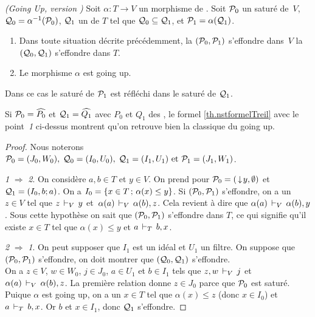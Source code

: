 \begin{proposition} 
\label{propGUclass} {\em (Going Up, version \procs)} 
Soit $\alpha:T\to V$ un morphisme de \trdis.  
Soit ${\cal P}_0$ un  \proi saturé de~$V$, ${\cal Q}_0=\alpha^{-1}({\cal P}_0)$, ${\cal Q}_1$ 
un \proi  de $T$ tel que ${\cal Q}_0\subseteq {\cal Q}_1$, et ${\cal P}_1=\alpha({\cal Q}_1)$.   \Propeq
\begin{enumerate}
\item  Dans toute situation décrite précédemment, la \proc 
$({\cal P}_0,{\cal P}_1)$ 
s'effondre dans~$V$ \ssi la \proc $({\cal Q}_0,{\cal Q}_1)$ s'effondre dans $T$.
\item  Le morphisme $\alpha$ est going up.
\end{enumerate}
Dans ce cas le saturé de ${\cal P}_1$ est réfléchi dans le saturé de ${\cal Q}_1$.
\end{proposition}
Si ${\cal P}_0=\widehat{P_0}$ et ${\cal Q}_1=\widehat{Q_1}$ avec $P_0$ et $Q_1$ des \ideps, le \nst formel \ref{th.nstformelTreil} avec le point~\emph{1} ci-dessus montrent qu'on retrouve bien la \dfn classique du going up.
\begin{proof}
Nous noterons
${\cal P}_0=(J_0,W_0),\; {\cal Q}_0= (I_0,U_0),\; {\cal Q}_1= (I_1,U_1) \hbox{ et }
{\cal P}_1= (J_{1},W_{1})$. 

\smallskip \noindent 
\emph{1} $\Rightarrow$ \emph{2}. On considère $a,b\in T$ et $y\in V$. On prend pour ${\cal P}_0=(\,\downarrow\! y,\emptyset)$ et ${\cal Q}_1=(I_0,b;a)$. On a $I_0=\{x\in T \,; \,\alpha(x)\leq y\}$.
Si $({\cal P}_0,{\cal P}_1)$ s'effondre, on a un $z\in V$ tel que $z\,\vdash_{V}\, y$ \hbox{et $\alpha(a)\,\vdash_{V}\, \alpha(b), z$}. Cela revient à dire que $\alpha(a)\,\vdash_{V}\, \alpha(b), y$. Sous cette hypothèse on sait que $({\cal P}_0,{\cal P}_1)$ s'effondre dans $T$, ce qui signifie qu'il existe $x\in T$ tel que $\alpha(x)\leq y$ et $a\,\vdash_{T}\, b, x$. 

\smallskip \noindent 
\emph{2} $\Rightarrow$ \emph{1}. On peut supposer \spdg que $I_1$ est un idéal et $U_1$ un filtre.
On suppose que $({\cal P}_0,{\cal P}_1)$ s'effondre, on doit montrer que $({\cal Q}_0,{\cal Q}_1)$ s'effondre.  \\
On a $z\in V$, $w\in W_0$, $j\in J_0$,  $a\in U_1$ et $b\in I_1$ tels que $z,w\,\vdash_{V}\, j$ et $\alpha(a) \,\vdash_{V}\, \alpha(b), z$. La première relation donne $z\in J_0$ parce que ${\cal P}_0$ est saturé. Puique $\alpha$ est going up, on a un $x\in T$ tel que $\alpha(x)\leq z$ (donc $x\in I_0$) et $a \,\vdash_{T}\, b,x$. Or $b$ et $x\in I_1$, donc ${\cal Q}_1$ s'effondre. 
 \end{proof}

